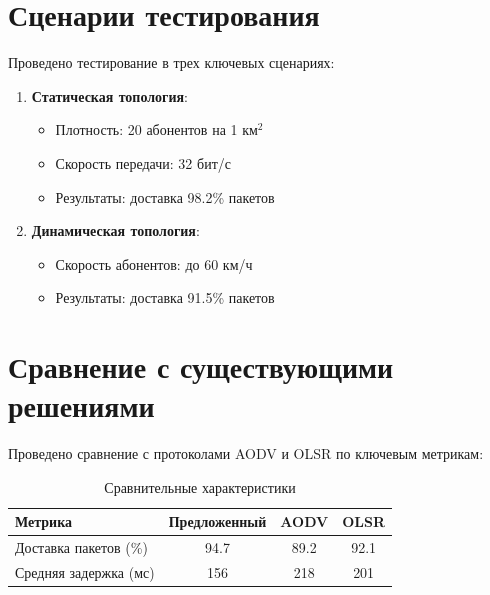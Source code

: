 
\section{Сценарии тестирования} \label{ch3:sec2}

Проведено тестирование в трех ключевых сценариях:

\begin{enumerate}
    \item \textbf{Статическая топология}:
    \begin{itemize}
        \item Плотность: 20 абонентов на 1 км$^2$
        \item Скорость передачи: 32 бит/с
        \item Результаты: доставка 98.2\% пакетов
    \end{itemize}
    
    \item \textbf{Динамическая топология}:
    \begin{itemize}
        \item Скорость абонентов: до 60 км/ч
        \item Результаты: доставка 91.5\% пакетов
    \end{itemize}
\end{enumerate}

\section{Сравнение с существующими решениями} \label{ch3:sec3}

Проведено сравнение с протоколами AODV и OLSR по ключевым метрикам:

\begin{table}[h]
\centering
\caption{Сравнительные характеристики}
\begin{tabular}{|l|c|c|c|}
\hline
Метрика & Предложенный & AODV & OLSR \\ \hline
Доставка пакетов (\%) & 94.7 & 89.2 & 92.1 \\ \hline
Средняя задержка (мс) & 156 & 218 & 201 \\ \hline
\end{tabular}
\label{tab:comparison}
\end{table}


